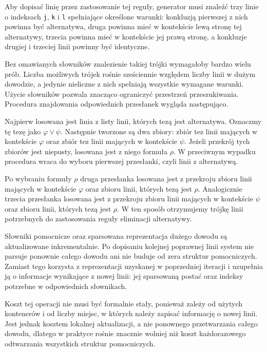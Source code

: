 \documentclass[shortabstract]{iithesis}
\theoremstyle{definition}
\theoremstyle{remark}
\theoremstyle{plain}
\begin{document}
Aby dopisać linię przez zastosowanie tej reguły, generator musi znaleźć trzy
linie o indeksach \texttt{j}, \texttt{k} i \texttt{l} spełniające określone warunki:
konkluzją pierwszej z nich powinna być alternatywa, druga powinna mieć w kontekście
lewą stronę tej alternatywy, trzecia powinna mieć w kontekście jej prawą stronę,
a konkluzje drugiej i trzeciej linii powinny być identyczne.

Bez omawianych słowników znalezienie takiej trójki wymagałoby bardzo wielu prób.
Liczba możliwych trójek rośnie sześciennie względem liczby linii w dużym dowodzie,
a jedynie nieliczne z nich spełniają wszystkie wymagane warunki. Użycie słowników
pozwala znacząco ograniczyć przestrzeń przeszukiwania. Procedura znajdowania
odpowiednich przesłanek wygląda następująco.

Najpierw losowana jest linia z listy linii, których tezą jest alternatywa.
Oznaczmy tę tezę jako \(\varphi \vee \psi\). Następnie tworzone są dwa zbiory:
zbiór tez linii mających w kontekście \(\varphi\) oraz zbiór tez linii mających
w kontekście \(\psi\). Jeżeli przekrój tych zbiorów jest niepusty, losowana jest
z niego formuła \(\rho\). W przeciwnym wypadku procedura wraca do wyboru pierwszej
przesłanki, czyli linii z alternatywą.

Po wybraniu formuły \(\rho\) druga przesłanka losowana jest z przekroju zbioru
linii mających w kontekście \(\varphi\) oraz zbioru linii, których tezą jest
\(\rho\). Analogicznie trzecia przesłanka losowana jest z przekroju zbioru linii
mających w kontekście \(\psi\) oraz zbioru linii, których tezą jest \(\rho\).
W ten sposób otrzymujemy trójkę linii potrzebnych do zastosowania reguły
eliminacji alternatywy.

Słowniki pomocnicze oraz sparsowana reprezentacja dużego dowodu są aktualizowane
inkrementalnie. Po dopisaniu kolejnej poprawnej linii system nie parsuje ponownie
całego dowodu ani nie buduje od zera struktur pomocniczych. Zamiast tego korzysta
z reprezentacji uzyskanej w poprzedniej iteracji i uzupełnia ją o informacje
wynikające z nowej linii: jej sparsowaną postać oraz indeksy potrzebne w odpowiednich
słownikach.

Koszt tej operacji nie musi być formalnie stały, ponieważ zależy od użytych
kontenerów i od liczby miejsc, w których należy zapisać informację o nowej linii.
Jest jednak kosztem lokalnej aktualizacji, a nie ponownego przetwarzania całego
dowodu, dlatego w praktyce rośnie znacznie wolniej niż koszt każdorazowego
odtwarzania wszystkich struktur pomocniczych.
\end{document}
